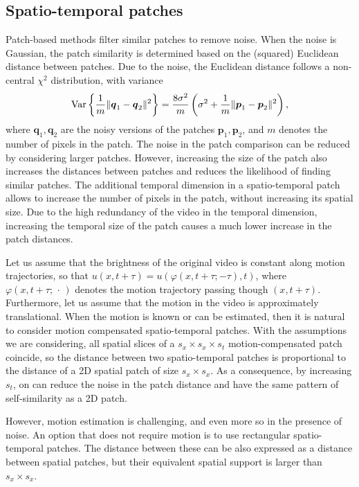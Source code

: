 \documentclass[10pt, journal, twocolumn, final, a4paper]{IEEEtran}
\newcommand{\ma}[1]{\boldsymbol{#1}}
\begin{document}
\subsection{Spatio-temporal patches}

Patch-based methods filter similar patches to remove noise. When the noise is
Gaussian, the patch similarity is determined based on the (squared) Euclidean distance 
between patches. Due to the noise, the Euclidean distance follows a non-central
$\chi^2$ distribution, with variance
\[\textnormal{Var}\left\{\frac1{m}\|\ma q_1 - \ma q_2\|^2\right\} = \frac{8\sigma^2}{m}\left(\sigma^2 + \frac1{m}\|\ma p_1 - \ma p_2\|^2\right),\]
where $\ma q_1, \ma q_2$ are the noisy versions of the patches $\ma p_1, \ma p_2$, 
and $m$ denotes the number of pixels in the patch. The noise in the patch comparison
can be reduced by considering larger patches.
However, increasing the size of the patch also increases the distances between
patches and reduces the likelihood of finding similar patches.
%
The additional temporal dimension in a spatio-temporal patch allows to increase
the number of pixels in the patch, without increasing its spatial size.
Due to the high redundancy of the video in the temporal dimension, increasing the 
temporal size of the patch causes a much lower increase in the patch distances.
%

Let us assume that 
the brightness of the original video is constant along motion trajectories, so
that $u(x,t + \tau) = u(\varphi(x,t + \tau; -\tau),t)$, where
$\varphi(x,t+\tau;\, \cdot\, )$ denotes the motion trajectory passing though
$(x,t + \tau)$.
Furthermore, let us assume that the motion in the video is approximately
translational.
When the motion is known or can be estimated, then it is natural to consider
motion compensated spatio-temporal patches. 
With the assumptions we are considering, all spatial slices of a $s_x\times s_x\times s_t$ motion-compensated patch
coincide, so the distance between two spatio-temporal patches is proportional to
the distance of a 2D spatial patch of size $s_x\times s_x$.
%
As a consequence, by increasing $s_t$, on can reduce the 
noise in the patch distance and have the same pattern of self-similarity as a 
2D patch.

However, motion estimation is challenging, and even more so in the presence of noise.
An option that does not require motion is to use rectangular spatio-temporal patches.
The distance between these can be also expressed as a distance between spatial patches,
but their equivalent spatial support is larger than $s_x\times s_x$.
\end{document}
